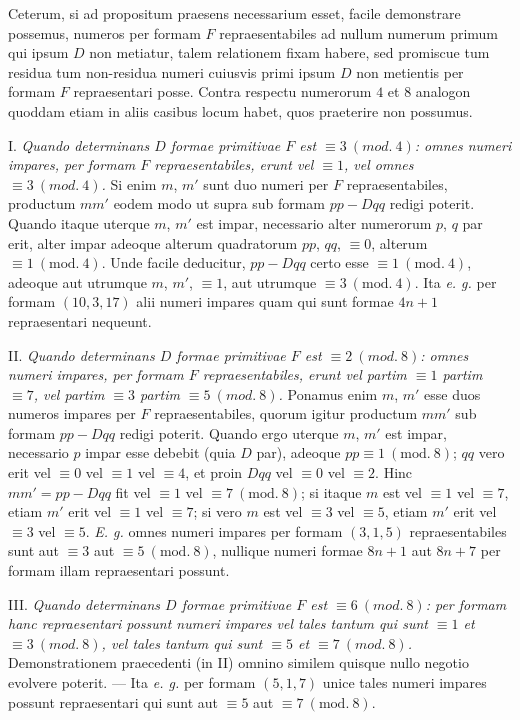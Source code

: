 Ceterum, si ad propositum praesens necessarium esset, facile demonstrare possemus, numeros per formam $F$ repraesentabiles ad nullum numerum primum qui ipsum $D$ non metiatur, talem relationem fixam habere, sed promiscue tum residua tum non-residua numeri cuiusvis primi ipsum $D$ non metientis per formam $F$ repraesentari posse. Contra respectu numerorum $4$ et $8$ analogon quoddam etiam in aliis casibus locum habet, quos praeterire non possumus.

I. \textit{Quando determinans $D$ formae primitivae $F$ est $\equiv3\ (\mathit{mod.}\ 4)$: omnes numeri impares, per formam $F$ repraesentabiles, erunt vel $\equiv1$, vel omnes $\equiv3\ (\mathit{mod.}\ 4)$.} Si enim $m$, $m'$ sunt duo numeri per $F$ repraesentabiles, productum $mm'$ eodem modo ut supra sub formam $pp-Dqq$ redigi poterit. Quando itaque uterque $m$, $m'$ est impar, necessario alter numerorum $p$, $q$ par erit, alter impar adeoque alterum quadratorum $pp$, $qq$, $\equiv0$, alterum $\equiv1\ (\mathrm{mod.}\ 4)$. Unde facile deducitur, $pp-Dqq$ certo esse $\equiv1\ (\mathrm{mod.}\ 4)$, adeoque aut utrumque $m$, $m'$, $\equiv1$, aut utrumque $\equiv3\ (\mathrm{mod.}\ 4)$. Ita \textit{e. g.} per formam $(10,3,17)$ alii numeri impares quam qui sunt formae $4n+1$ repraesentari nequeunt.

II. \textit{Quando determinans $D$ formae primitivae $F$ est $\equiv2\ (\mathit{mod.}\ 8)$: omnes numeri impares, per formam $F$ repraesentabiles, erunt vel partim $\equiv1$ partim $\equiv7$, vel partim $\equiv3$ partim $\equiv5\ (\mathit{mod.}\ 8)$.} Ponamus enim $m$, $m'$ esse duos numeros
impares per $F$ repraesentabiles, quorum igitur productum $mm'$ sub formam $pp-Dqq$ redigi poterit. Quando ergo uterque $m$, $m'$ est impar, necessario $p$ impar esse debebit (quia $D$ par), adeoque $pp\equiv1\ (\mathrm{mod.}\ 8)$; $qq$ vero erit vel $\equiv0$ vel $\equiv1$ vel $\equiv4$, et proin $Dqq$ vel $\equiv0$ vel $\equiv2$. Hinc $mm'=pp-Dqq$ fit vel $\equiv1$ vel $\equiv7\ (\mathrm{mod.}\ 8)$; si itaque $m$ est vel $\equiv1$ vel $\equiv7$, etiam $m'$ erit vel $\equiv1$ vel $\equiv7$; si vero $m$ est vel $\equiv3$ vel $\equiv5$, etiam $m'$ erit vel $\equiv3$ vel $\equiv5$. \textit{E. g.} omnes numeri impares per formam $(3,1,5)$ repraesentabiles sunt aut $\equiv3$ aut $\equiv5\ (\mathrm{mod.}\ 8)$, nullique numeri formae $8n+1$ aut $8n+7$ per formam illam repraesentari possunt.

III. \textit{Quando determinans $D$ formae primitivae $F$ est $\equiv6\ (\mathit{mod.}\ 8)$: per formam hanc repraesentari possunt numeri impares vel tales tantum qui sunt $\equiv1$ et $\equiv3\ (\mathit{mod.}\ 8)$, vel tales tantum qui sunt $\equiv5$ et $\equiv7\ (\mathit{mod.}\ 8)$.} Demonstrationem praecedenti (in II) omnino similem quisque nullo negotio evolvere poterit. --- Ita \textit{e. g.} per formam $(5,1,7)$ unice tales numeri impares possunt repraesentari qui sunt aut $\equiv5$ aut $\equiv7\ (\mathrm{mod.}\ 8)$.

